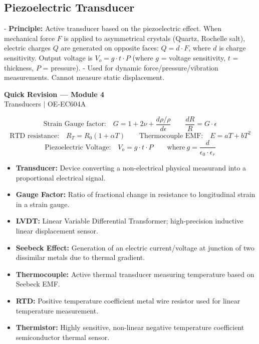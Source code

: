 \documentclass[12pt,a4paper]{article}
\begin{document}
\subsection{Piezoelectric Transducer}
- \textbf{Principle:} Active transducer based on the piezoelectric effect. When mechanical force $F$ is applied to asymmetrical crystals (Quartz, Rochelle salt), electric charges $Q$ are generated on opposite faces: $Q = d \cdot F$, where $d$ is charge sensitivity. Output voltage is $V_o = g \cdot t \cdot P$ (where $g$ = voltage sensitivity, $t$ = thickness, $P$ = pressure).
- Used for dynamic force/pressure/vibration measurements. Cannot measure static displacement.

\newpage
\begin{center}
  {\large\bfseries\color{myred} Quick Revision --- Module 4}\\[3pt]
  {\small\color{mydark} Transducers $|$ OE-EC604A}
\end{center}
\noindent{\color{myred}\rule{\linewidth}{1.2pt}}
\vspace{4pt}

\begin{tcolorbox}[formulabox, title={\textbf{Key Transducer Formulas}}]
$$\text{Strain Gauge factor:} \quad G = 1 + 2\nu + \frac{d\rho/\rho}{d\epsilon} \qquad \frac{dR}{R} = G \cdot \epsilon$$
$$\text{RTD resistance:} \quad R_T = R_0(1 + \alpha T) \qquad \text{Thermocouple EMF:} \quad E = aT + bT^2$$
$$\text{Piezoelectric Voltage:} \quad V_o = g \cdot t \cdot P \qquad \text{where} \ g = \frac{d}{\epsilon_0 \cdot \epsilon_r}$$
\end{tcolorbox}

\begin{tcolorbox}[defbox, title={\textbf{One-Line Definitions}}]
\begin{itemize}[leftmargin=*, itemsep=2.5pt, topsep=0pt]
  \item \textbf{Transducer:} Device converting a non-electrical physical measurand into a proportional electrical signal.
  \item \textbf{Gauge Factor:} Ratio of fractional change in resistance to longitudinal strain in a strain gauge.
  \item \textbf{LVDT:} Linear Variable Differential Transformer; high-precision inductive linear displacement sensor.
  \item \textbf{Seebeck Effect:} Generation of an electric current/voltage at junction of two dissimilar metals due to thermal gradient.
  \item \textbf{Thermocouple:} Active thermal transducer measuring temperature based on Seebeck EMF.
  \item \textbf{RTD:} Positive temperature coefficient metal wire resistor used for linear temperature measurement.
  \item \textbf{Thermistor:} Highly sensitive, non-linear negative temperature coefficient semiconductor thermal sensor.
\end{itemize}
\end{tcolorbox}
\end{document}
